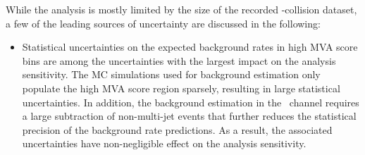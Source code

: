 While the analysis is mostly limited by the size of the recorded \pp-collision
dataset, a few of the leading sources of uncertainty are discussed in the
following:
\begin{itemize}

\item Statistical uncertainties on the expected background rates in high MVA
  score bins are among the uncertainties with the largest impact on the analysis
  sensitivity. The MC simulations used for background estimation only populate
  the high MVA score region sparsely, resulting in large statistical
  uncertainties. In addition, the \faketauhadvis background estimation in the
  \hadhad~channel requires a large subtraction of non-multi-jet events that
  further reduces the statistical precision of the background rate
  predictions. As a result, the associated uncertainties have non-negligible
  effect on the analysis sensitivity.





\end{itemize}
